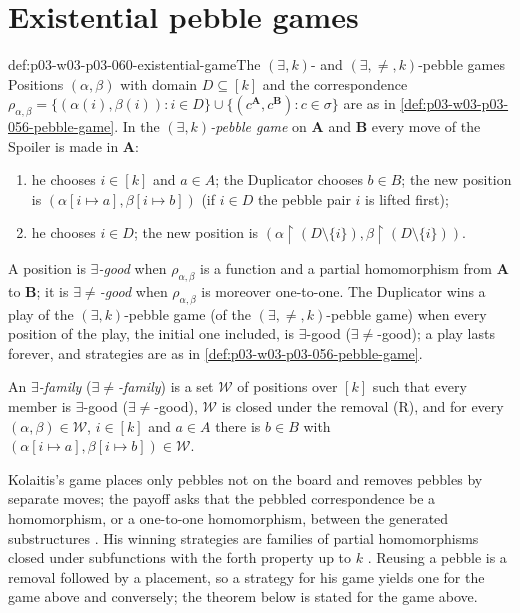 \section{Existential pebble games}
\label{sec:p03-w03-p03-060-games}

\begin{hbdefinition}{def:p03-w03-p03-060-existential-game}{The \((\exists,k)\)- and \((\exists,\neq,k)\)-pebble games}
Positions \((\alpha,\beta)\) with domain \(D\subseteq[k]\) and the
correspondence
\(\rho_{\alpha,\beta}=\{(\alpha(i),\beta(i)):i\in D\}\cup\{(c^{\mathbf A},c^{\mathbf B}):c\in\sigma\}\)
are as in \cref{def:p03-w03-p03-056-pebble-game}. In the
\emph{\((\exists,k)\)-pebble game} on \(\mathbf A\) and \(\mathbf B\) every
move of the Spoiler is made in \(\mathbf A\):
\begin{enumerate}
\item[(P\(_\exists\))] he chooses \(i\in[k]\) and \(a\in A\); the
      Duplicator chooses \(b\in B\); the new position is
      \((\alpha[i\mapsto a],\beta[i\mapsto b])\) (if \(i\in D\) the pebble
      pair \(i\) is lifted first);
\item[(R)] he chooses \(i\in D\); the new position is
      \((\alpha\restriction(D\setminus\{i\}),\beta\restriction(D\setminus\{i\}))\).
\end{enumerate}
A position is \emph{\(\exists\)-good} when \(\rho_{\alpha,\beta}\) is a
function and a partial homomorphism from \(\mathbf A\) to \(\mathbf B\);
it is \emph{\(\exists{\neq}\)-good} when \(\rho_{\alpha,\beta}\) is moreover
one-to-one. The Duplicator wins a play of the \((\exists,k)\)-pebble game
(of the \((\exists,\neq,k)\)-pebble game) when every position of the play,
the initial one included, is \(\exists\)-good (\(\exists{\neq}\)-good); a
play lasts forever, and strategies are as in
\cref{def:p03-w03-p03-056-pebble-game}.

An \emph{\(\exists\)-family} (\emph{\(\exists{\neq}\)-family}) is a set
\(\mathcal W\) of positions over \([k]\) such that every member is
\(\exists\)-good (\(\exists{\neq}\)-good), \(\mathcal W\) is closed under
the removal (R), and for every \((\alpha,\beta)\in\mathcal W\), \(i\in[k]\)
and \(a\in A\) there is \(b\in B\) with
\((\alpha[i\mapsto a],\beta[i\mapsto b])\in\mathcal W\).
\end{hbdefinition}

Kolaitis's game places only pebbles not on the board and removes pebbles by
separate moves; the payoff asks that the pebbled correspondence be a
homomorphism, or a one-to-one homomorphism, between the generated
substructures \cite[Def.~8.4, pp.~71--72]{Kolaitis2003ExpressivePowerNotes}.
His winning strategies are families of partial homomorphisms closed under
subfunctions with the forth property up to \(k\) \cite[Def.~8.5,
p.~72]{Kolaitis2003ExpressivePowerNotes}. Reusing a pebble is a removal
followed by a placement, so a strategy for his game yields one for the game
above and conversely; the theorem below is stated for the game above.

